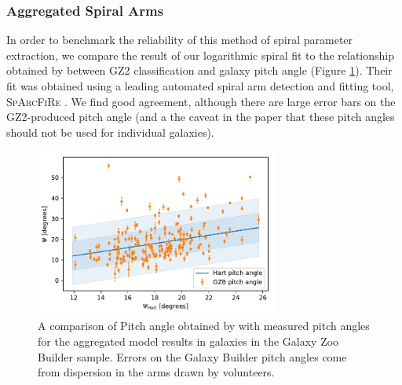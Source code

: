 \documentclass[../main.tex]{subfiles}
\begin{document}
\subsubsection{Aggregated Spiral Arms}
In order to benchmark the reliability of this method of spiral parameter extraction, we compare the result of our logarithmic spiral fit to the relationship obtained by \citet{Hart2016:1607.01019v1} between GZ2 classification and galaxy pitch angle (Figure \ref{fig:hart_pitch_angle}). Their fit was obtained using a leading automated spiral arm detection and fitting tool, \textsc{SpArcFiRe} \citep{Davis2014:1402.1910v1}. We find good agreement, although there are large error bars on the GZ2-produced pitch angle (and a the caveat in the paper that these pitch angles should not be used for individual galaxies).

\begin{figure}
  \includegraphics[width=8cm]{images__results/pitch-angle-comparison.pdf}
  \caption{A comparison of Pitch angle obtained by \citet{Hart2016:1607.01019v1} with measured pitch angles for the aggregated model results in galaxies in the Galaxy Zoo Builder sample. Errors on the Galaxy Builder pitch angles come from dispersion in the arms drawn by volunteers.}
  \label{fig:hart_pitch_angle}
\end{figure}


\end{document}
